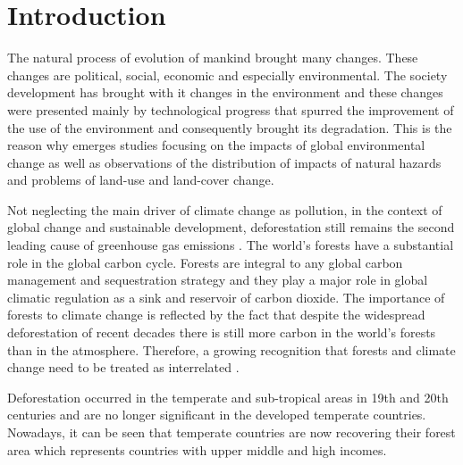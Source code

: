 
\chapter*{Introduction}  %

\ifpdf
    \graphicspath{{Introduction/Figs/}{Introduction/}}
\else
    \graphicspath{{Introduction/Figs/}{Introduction/}}
\fi

The natural process of evolution of mankind brought many changes. These changes are political, social, economic and especially environmental. The society development has brought with it changes in the environment and these changes were presented mainly by technological progress that spurred the improvement of the use of the environment and consequently brought its degradation. This is the reason why emerges studies focusing on the impacts of global environmental change as well as observations of the distribution of impacts of natural hazards and problems of land-use and land-cover change. 

Not neglecting the main driver of climate change as pollution, in the context of global change and sustainable development, deforestation still remains the second leading cause of greenhouse gas emissions \citep{culas11}. The world’s forests have a substantial role in the global carbon cycle. Forests are integral to any global carbon management and sequestration strategy and they play a major role in global climatic regulation as a sink and reservoir of carbon dioxide. The importance of forests to climate change is reflected by the fact that despite the widespread deforestation of recent decades there is still more carbon in the world's forests than in the atmosphere. Therefore, a growing recognition that forests and climate change need to be treated as interrelated \citep{JONG}. 

Deforestation occurred in the temperate and sub-tropical areas in 19th and 20th centuries and are no longer significant in the developed temperate countries. Nowadays, it can be seen that temperate countries are now recovering their forest area which represents countries with upper middle and high incomes.

